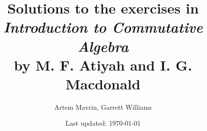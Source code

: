 \documentclass{solutions}
\title{\texorpdfstring{%
Solutions to the exercises in\\
\emph{Introduction to Commutative Algebra}\\
by M. F. Atiyah and I. G. Macdonald}%
{Atiyah-Macdonald Solutions}}
\author{Artem Mavrin, Garrett Williams}
\date{Last updated: \today}
\begin{document}
\frontmatter
\maketitle
\tableofcontents

\mainmatter

\GenerateSolutions

\backmatter

\nocite{AtiyahMacDonald}
\printbibliography[heading=bibintoc]
\end{document}
